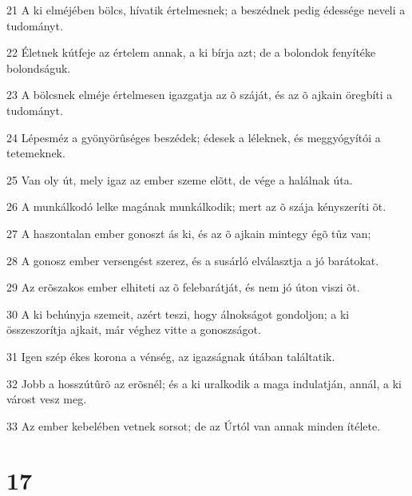 \par 21 A ki elméjében bölcs, hívatik értelmesnek; a beszédnek pedig édessége neveli a tudományt.
\par 22 Életnek kútfeje az értelem annak, a ki bírja azt; de a bolondok fenyítéke bolondságuk.
\par 23 A bölcsnek elméje értelmesen igazgatja az õ száját, és az õ ajkain öregbíti a tudományt.
\par 24 Lépesméz a gyönyörûséges beszédek; édesek a léleknek, és meggyógyítói a tetemeknek.
\par 25 Van oly út, mely igaz az ember szeme elõtt, de vége a halálnak úta.
\par 26 A munkálkodó lelke magának munkálkodik; mert az õ szája kényszeríti õt.
\par 27 A haszontalan ember gonoszt ás ki, és az õ ajkain mintegy égõ tûz van;
\par 28 A gonosz ember versengést szerez, és a susárló elválasztja a jó barátokat.
\par 29 Az erõszakos ember elhiteti az õ felebarátját, és nem jó úton viszi õt.
\par 30 A ki behúnyja szemeit, azért teszi, hogy álnokságot gondoljon; a ki összeszorítja ajkait, már véghez vitte a gonoszságot.
\par 31 Igen szép ékes korona a vénség, az igazságnak útában találtatik.
\par 32 Jobb a hosszútûrõ az erõsnél; és a ki uralkodik a maga indulatján, annál, a ki várost vesz meg.
\par 33 Az ember kebelében vetnek sorsot; de az Úrtól van annak minden ítélete.

\chapter{17}

